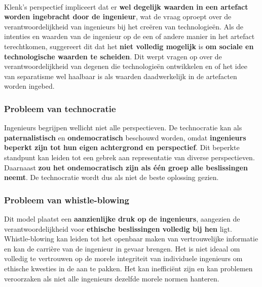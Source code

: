 \documentclass[../summary.tex]{subfiles}
\begin{document}
	\ \\
	Klenk's perspectief impliceert dat er \textbf{wel degelijk waarden in een artefact worden ingebracht door de ingenieur}, wat de vraag oproept over de verantwoordelijkheid van ingenieurs bij het creëren van technologieën. Als de intenties en waarden van de ingenieur op de een of andere manier in het artefact terechtkomen, suggereert dit dat het \textbf{niet volledig mogelijk} is \textbf{om sociale en technologische waarden te scheiden}. Dit werpt vragen op over de verantwoordelijkheid van degenen die technologieën ontwikkelen en of het idee van separatisme wel haalbaar is als waarden daadwerkelijk in de artefacten worden ingebed.
	
	\subsubsection{Probleem van technocratie}
	
	Ingenieurs begrijpen wellicht niet alle perspectieven. De technocratie kan als \textbf{paternalistisch} en \textbf{ondemocratisch} beschouwd worden, omdat \textbf{ingenieurs beperkt zijn tot hun eigen achtergrond en perspectief}. Dit beperkte standpunt kan leiden tot een gebrek aan representatie van diverse perspectieven. Daarnaast \textbf{zou het ondemocratisch zijn als één groep alle beslissingen neemt}. De technocratie wordt dus als niet de beste oplossing gezien.
	
	\subsubsection{Probleem van whistle-blowing}
	
	Dit model plaatst een \textbf{aanzienlijke druk op de ingenieurs}, aangezien de verantwoordelijkheid voor \textbf{ethische beslissingen volledig bij hen} ligt. Whistle-blowing kan leiden tot het openbaar maken van vertrouwelijke informatie en kan de carrière van de ingenieur in gevaar brengen. Het is niet ideaal om volledig te vertrouwen op de morele integriteit van individuele ingenieurs om ethische kwesties in de aan te pakken. Het kan inefficiënt zijn en kan problemen veroorzaken als niet alle ingenieurs dezelfde morele normen hanteren.
	
\end{document}
